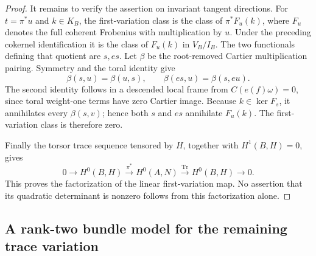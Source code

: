 \begin{proof}
It remains to verify the assertion on invariant tangent directions.
For $t=\pi^*u$ and $k\in K_B$, the first-variation class is the
class of $\pi^*F_u(k)$, where $F_u$ denotes the full coherent
Frobenius with multiplication by $u$.
Under the preceding cokernel identification it is the class of
$F_u(k)$ in $V_B/I_B$.
The two functionals defining that quotient are $s,es$.
Let $\beta$ be the root-removed Cartier multiplication pairing.
Symmetry and the toral identity give
\[
 \beta(s,u)=\beta(u,s),\qquad
 \beta(es,u)=\beta(s,eu).
\]
The second identity follows in a descended local frame from
$C(e(f)\omega)=0$, since toral weight-one terms have zero Cartier
image. Because $k\in\ker F_s$, it annihilates every
$\beta(s,v)$; hence both $s$ and $es$ annihilate $F_u(k)$.
The first-variation class is therefore zero.

Finally the torsor trace sequence tensored by $H$, together with
$H^1(B,H)=0$, gives
\[
 0\to H^0(B,H)\xrightarrow{\pi^*}H^0(A,N)
       \xrightarrow{\operatorname{Tr}}H^0(B,H)\to0.
\]
This proves the factorization of the linear first-variation map.
No assertion that its quadratic determinant is nonzero follows
from this factorization alone.
\end{proof}


\subsection{A rank-two bundle model for the remaining trace variation}


